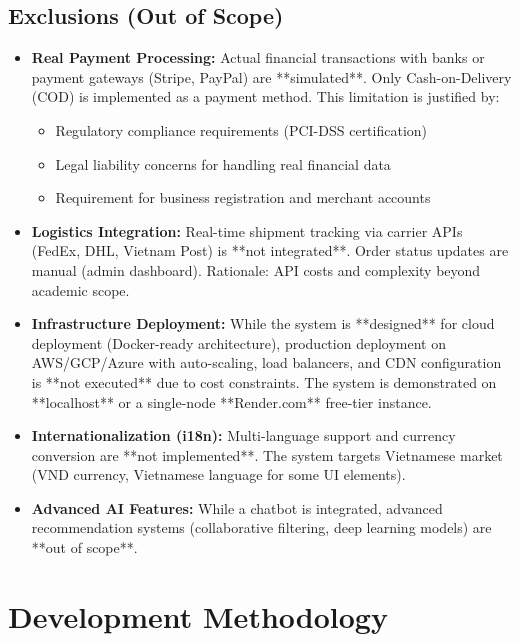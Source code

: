 \subsection{Exclusions (Out of Scope)}

\begin{itemize}
    \item \textbf{Real Payment Processing:} Actual financial transactions with banks or payment gateways (Stripe, PayPal) are **simulated**. Only Cash-on-Delivery (COD) is implemented as a payment method. This limitation is justified by:
    \begin{itemize}
        \item Regulatory compliance requirements (PCI-DSS certification)
        \item Legal liability concerns for handling real financial data
        \item Requirement for business registration and merchant accounts
    \end{itemize}
    
    \item \textbf{Logistics Integration:} Real-time shipment tracking via carrier APIs (FedEx, DHL, Vietnam Post) is **not integrated**. Order status updates are manual (admin dashboard). Rationale: API costs and complexity beyond academic scope.
    
    \item \textbf{Infrastructure Deployment:} While the system is **designed** for cloud deployment (Docker-ready architecture), production deployment on AWS/GCP/Azure with auto-scaling, load balancers, and CDN configuration is **not executed** due to cost constraints. The system is demonstrated on **localhost** or a single-node **Render.com** free-tier instance.
    
    \item \textbf{Internationalization (i18n):} Multi-language support and currency conversion are **not implemented**. The system targets Vietnamese market (VND currency, Vietnamese language for some UI elements).
    
    \item \textbf{Advanced AI Features:} While a chatbot is integrated, advanced recommendation systems (collaborative filtering, deep learning models) are **out of scope**.
\end{itemize}

\section{Development Methodology}

